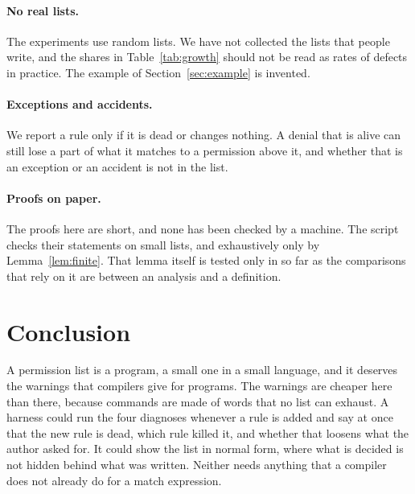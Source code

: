 \documentclass[acmsmall,nonacm,screen]{acmart}
\begin{document}
\paragraph{No real lists.} The experiments use random lists. We have not collected the lists
that people write, and the shares in Table~\ref{tab:growth} should not be read as rates of
defects in practice. The example of Section~\ref{sec:example} is invented.

\paragraph{Exceptions and accidents.} We report a rule only if it is dead or changes
nothing. A denial that is alive can still lose a part of what it matches to a permission
above it, and whether that is an exception or an accident is not in the list.

\paragraph{Proofs on paper.} The proofs here are short, and none has been checked by a
machine. The script checks their statements on small lists, and exhaustively only by
Lemma~\ref{lem:finite}. That lemma itself is tested only in so far as the comparisons that
rely on it are between an analysis and a definition.

\section{Conclusion}

A permission list is a program, a small one in a small language, and it deserves the warnings
that compilers give for programs. The warnings are cheaper here than there, because commands
are made of words that no list can exhaust. A harness could run the four diagnoses whenever a
rule is added and say at once that the new rule is dead, which rule killed it, and whether
that loosens what the author asked for. It could show the list in normal form, where what is
decided is not hidden behind what was written. Neither needs anything that a compiler does
not already do for a match expression.



\end{document}
